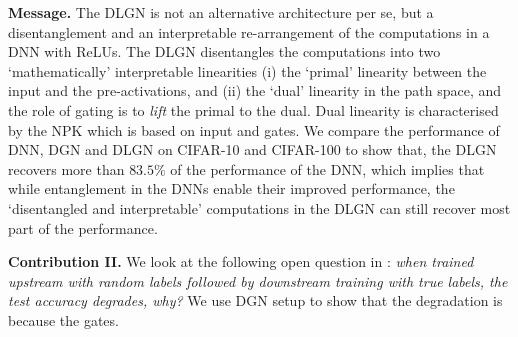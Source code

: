 \textbf{Message.} The DLGN is not an alternative architecture per se, but a disentanglement and an interpretable re-arrangement of the computations in a DNN with ReLUs. The DLGN disentangles the computations into two  `mathematically' interpretable linearities (i) the `primal' linearity between the input and the pre-activations, and (ii) the `dual' linearity in the path space, and the role of gating is to \emph{lift} the primal to the dual. Dual linearity is characterised by the NPK which is based on input and gates. We compare the performance of DNN, DGN and DLGN on CIFAR-10 and CIFAR-100 to show that, the DLGN recovers more than $83.5\%$ of the performance of the DNN, which implies that while entanglement in the DNNs enable their improved performance,  the `disentangled and interpretable'  computations in the DLGN can still recover most part of the performance.

\textbf{Contribution II.} We look at the following open question in \citep{randlabel}: \emph{when trained upstream with random labels followed by downstream training with true labels, the test accuracy degrades, why?} We use DGN setup to show that the degradation is because the gates.%







